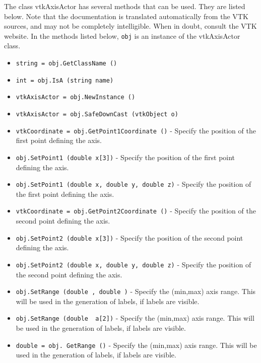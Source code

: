 The class vtkAxisActor has several methods that can be used.
  They are listed below.
Note that the documentation is translated automatically from the VTK sources,
and may not be completely intelligible.  When in doubt, consult the VTK website.
In the methods listed below, \verb|obj| is an instance of the vtkAxisActor class.
\begin{itemize}
\item  \verb|string = obj.GetClassName ()|

\item  \verb|int = obj.IsA (string name)|

\item  \verb|vtkAxisActor = obj.NewInstance ()|

\item  \verb|vtkAxisActor = obj.SafeDownCast (vtkObject o)|

\item  \verb|vtkCoordinate = obj.GetPoint1Coordinate ()| -  Specify the position of the first point defining the axis.

\item  \verb|obj.SetPoint1 (double x[3])| -  Specify the position of the first point defining the axis.

\item  \verb|obj.SetPoint1 (double x, double y, double z)| -  Specify the position of the first point defining the axis.

\item  \verb|vtkCoordinate = obj.GetPoint2Coordinate ()| -  Specify the position of the second point defining the axis.

\item  \verb|obj.SetPoint2 (double x[3])| -  Specify the position of the second point defining the axis.

\item  \verb|obj.SetPoint2 (double x, double y, double z)| -  Specify the position of the second point defining the axis.

\item  \verb|obj.SetRange (double , double )| -  Specify the (min,max) axis range. This will be used in the generation
 of labels, if labels are visible.

\item  \verb|obj.SetRange (double  a[2])| -  Specify the (min,max) axis range. This will be used in the generation
 of labels, if labels are visible.

\item  \verb|double = obj. GetRange ()| -  Specify the (min,max) axis range. This will be used in the generation
 of labels, if labels are visible.


\end{itemize}
